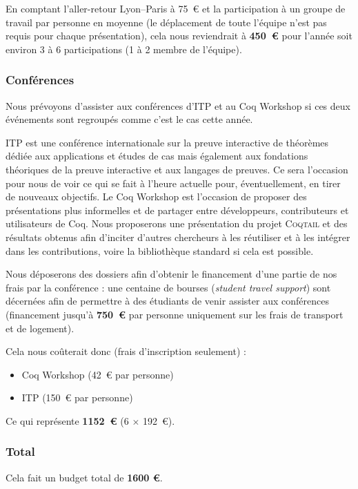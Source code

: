 \documentclass[11pt]{article}
\newcommand{\coqtail}{\textsc{Coqtail}}
\begin{document}
En comptant l'aller-retour Lyon--Paris à 75~€ et la participation à un groupe de travail par personne en moyenne (le déplacement de toute l'équipe n'est pas requis pour chaque présentation), cela nous reviendrait à \textbf{450~€} pour l'année soit environ 3 à 6 participations (1 à 2 membre de l'équipe).

\subsubsection{Conférences}
Nous prévoyons d'assister aux conférences d'ITP et au Coq Workshop si ces deux événements sont regroupés comme c'est le cas cette année.

ITP est une conférence internationale sur la preuve interactive de théorèmes dédiée aux applications et études de cas mais également aux fondations théoriques de la preuve interactive et aux langages de preuves. Ce sera l'occasion pour nous de voir ce qui se fait à l'heure actuelle pour, éventuellement, en tirer de nouveaux objectifs. Le Coq Workshop est l'occasion de proposer des présentations plus informelles et de partager entre développeurs, contributeurs et utilisateurs de Coq. Nous proposerons une présentation du projet \coqtail{} et des résultats obtenus afin d'inciter d'autres chercheurs à les réutiliser et à les intégrer dans les contributions, voire la bibliothèque standard si cela est possible.

Nous déposerons des dossiers afin d'obtenir le financement d'une partie de nos frais par la conférence : une centaine de bourses (\emph{student travel support}) sont décernées afin de permettre à des étudiants de venir assister aux conférences (financement jusqu'à \textbf{750~€} par personne uniquement sur les frais de transport et de logement).

Cela nous coûterait donc (frais d'inscription seulement) :
\begin{itemize}
	\item Coq Workshop (42~€ par personne)
	\item ITP (150~€ par personne)
\end{itemize}

Ce qui représente \textbf{1152~€} (6 $\times$ 192~€).

\subsubsection{Total}

Cela fait un budget total de \textbf{1600 €}.

\printbibliography
\end{document}
